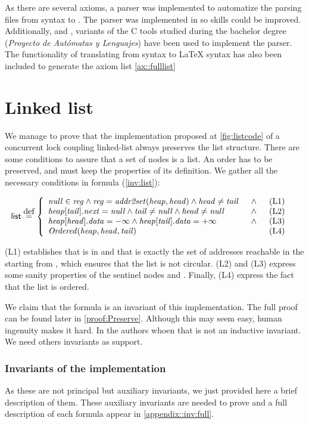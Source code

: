 As there are several axioms, a parser was implemented to automatize the parsing files from \spass syntax to \leap. 
%
The parser was implemented in \ocaml so \ocaml skills could be improved. Additionally,  and , \ocaml variants of the \mbox{C} tools studied during the bachelor degree (\textit{Proyecto de Autómatas y Lenguajes}) have been used to implement the parser.
%
The functionality of translating from \spass syntax to \LaTeX\; syntax has also been included to generate the axiom list \ref{ax::fulllist}



\section{Linked list}
%
We manage to prove that the implementation proposed at \ref{fig:listcode} of a concurrent lock coupling linked-list always preserves the list structure. 
%
There are some conditions to assure that a set of nodes is a list.
%
An order has to be preserved, \head and \tail must keep the properties of its definition. 
%
We gather all the necessary conditions in formula (\ref{inv:list}):


	\begin{align}
	  	\invPreserve & \overset{\mbox{def}}{=} \formulaFullListReducedBody
	  	\label{inv:list}
	\end{align}

(L1) establishes that \fNull is in \region and that \region is
exactly the set of addresses reachable in the \heap starting from
\head, which ensures that the list is not circular.
%
(L2) and (L3) express some sanity properties of the sentinel nodes
\head and \tail.
%
Finally, (L4) express the fact that the list is ordered.

We claim that the formula \invPreserve is an invariant of this implementation. The full proof can be found later in \ref{proof:Preserve}. 
%
Although this may seem easy, human ingenuity makes it hard. 
%
In  the authors whoen that \invPreserve is not an inductive invariant. 
%
We need others invariants as support.

\subsubsection{Invariants of the implementation}
\label{invariants}
As these are not principal but auxiliary invariants, we just provided here a brief description of them.
%
These auxiliary invariants are needed to prove \invPreserve and 
%
a full description of each formula appear in \ref{appendix::inv:full}.
%
%
%
%
